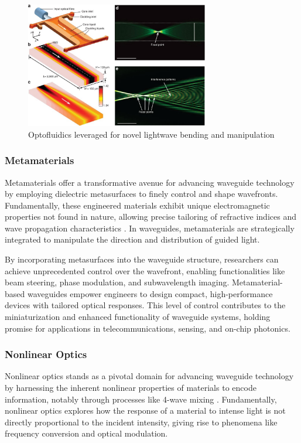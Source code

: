 \documentclass[10pt]{article}
\begin{document}
\begin{figure}[h]
    \centering
    \includegraphics[width = 8cm]{optofluidic.jpeg}
    \caption{Optofluidics leveraged for novel lightwave bending and manipulation} 
    \end{figure}


\subsubsection{Metamaterials}
Metamaterials offer a transformative avenue for advancing waveguide technology by employing dielectric
metasurfaces to finely control and shape wavefronts. Fundamentally, these engineered materials exhibit
unique electromagnetic properties not found in nature, allowing precise tailoring of refractive indices
and wave propagation characteristics \cite{ref03}. In waveguides, metamaterials are strategically integrated to manipulate
the direction and distribution of guided light.


By incorporating metasurfaces into the waveguide structure,
researchers can achieve unprecedented control over the wavefront,
enabling functionalities like beam steering, phase modulation, and subwavelength imaging.
Metamaterial-based waveguides empower engineers to design compact, high-performance devices with tailored optical responses.
This level of control contributes to the miniaturization and enhanced functionality of waveguide systems, holding promise
for applications in telecommunications, sensing, and on-chip photonics.


\subsubsection{Nonlinear Optics}
Nonlinear optics stands as a pivotal domain for advancing waveguide
technology by harnessing the inherent nonlinear properties of materials
to encode information, notably through processes like 4-wave mixing \cite{ref02}.
Fundamentally, nonlinear optics explores how the response of a material
to intense light is not directly proportional to the incident intensity,
giving rise to phenomena like frequency conversion and optical modulation.
\end{document}
